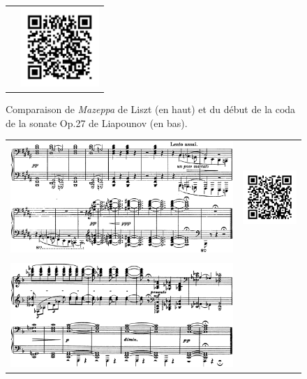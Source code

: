\begin{figure}[!p]
\begin{bigcenter}
\begin{tabular}{lr}
      &
      \includegraphics[width=3cm, keepaspectratio]{sonate-qr.png}
    \end{tabular}
  \end{bigcenter}
  \caption{\label{sonate-coda}Comparaison de \emph{Mazeppa} de Liszt (en haut) et du début de la coda de la sonate Op.27 de Liapounov (en bas).}
\end{figure}

\begin{figure}[!p]
  \begin{bigcenter}
    \begin{tabular}{lr}
      \vspace*{0.0cm}
      \includegraphics[width=12.5cm, keepaspectratio]{sonate-liszt-fin.png}
      &
      \includegraphics[width=3cm, keepaspectratio]{sonate-liszt-fin-qr.png}
      \\
      \vspace{0.5cm} &
      \\
      \includegraphics[width=12.5cm, keepaspectratio]{sonate-fin.png}

\end{tabular}
\end{bigcenter}
\end{figure}
